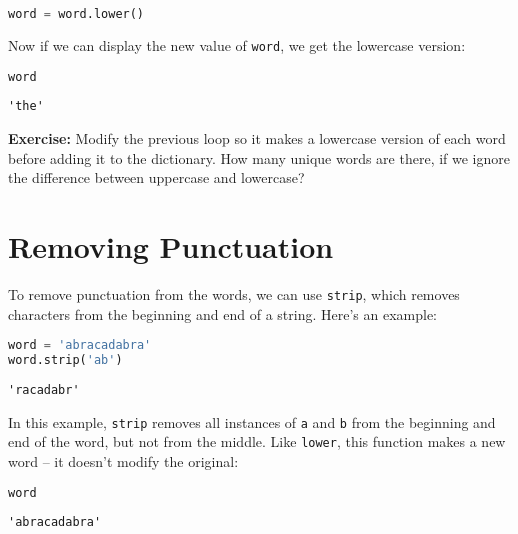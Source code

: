 \begin{lstlisting}[language=Python,style=source]
word = word.lower()
\end{lstlisting}

Now if we can display the new value of \passthrough{\lstinline!word!},
we get the lowercase version:

\begin{lstlisting}[language=Python,style=source]
word
\end{lstlisting}

\begin{lstlisting}[style=output]
'the'
\end{lstlisting}

\textbf{Exercise:} Modify the previous loop so it makes a lowercase
version of each word before adding it to the dictionary. How many unique
words are there, if we ignore the difference between uppercase and
lowercase?

\section{Removing Punctuation}\label{removing-punctuation}

To remove punctuation from the words, we can use
\passthrough{\lstinline!strip!}, which removes characters from the
beginning and end of a string. Here's an example:

\begin{lstlisting}[language=Python,style=source]
word = 'abracadabra'
word.strip('ab')
\end{lstlisting}

\begin{lstlisting}[style=output]
'racadabr'
\end{lstlisting}

In this example, \passthrough{\lstinline!strip!} removes all instances
of \passthrough{\lstinline!a!} and \passthrough{\lstinline!b!} from the
beginning and end of the word, but not from the middle. Like
\passthrough{\lstinline!lower!}, this function makes a new word -- it
doesn't modify the original:

\begin{lstlisting}[language=Python,style=source]
word
\end{lstlisting}

\begin{lstlisting}[style=output]
'abracadabra'
\end{lstlisting}


